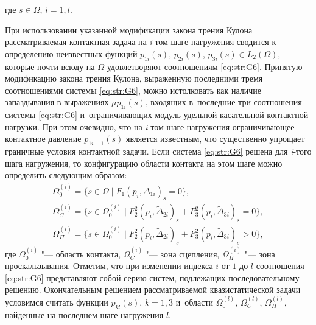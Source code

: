  где $s\in \Omega$, $i=\overline{1, l}$.

При использовании указанной модификации закона трения Кулона рассматриваемая контактная задача на \textit{i}-том шаге нагружения сводится к определению неизвестных функций $p_{1i} (s)$, $p_{2i} (s)$, $p_{3i} (s)\in L_{2} (\Omega)$, которые почти всюду на $\Omega $ удовлетворяют соотношениям \eqref{eq:str:G6}.
Принятую модификацию закона трения Кулона, выраженную последними тремя соотношениями системы \eqref{eq:str:G6}, можно истолковать как наличие запаздывания в выражениях $\mu  p_{1i} (s)$, входящих в~последние три соотношения системы \eqref{eq:str:G6} и~ограничивающих модуль удельной касательной контактной нагрузки.
При этом очевидно, что на \textit{i}-том шаге нагружения ограничивающее контактное давление $p_{1i-1} (s)$ является известным, что существенно упрощает граничные условия контактной задачи.
Если система \eqref{eq:str:G6} решена для \textit{i}-того шага нагружения, то конфигурацию области контакта на этом шаге можно определить следующим образом:
\begin{gather}
\Omega _{0}^{(i)} =\bigl\{s\in \Omega  \; |\; F_{1} \left(p_{i} ,\Delta _{1i} \right)_{s} =0\bigr\},
\\ 
\Omega _{C}^{(i)} =\bigl\{s\in \Omega _{0}^{(i)} \; |\; F_{2}^{2} (p_{i} ,\tilde{\Delta }_{2i} )_{s} +F_{3}^{2} (p_{i} ,\tilde{\Delta }_{3i} )_{s} =0\bigr\},
\\
\Omega _{\Pi }^{(i)} =\bigl\{s\in \Omega _{0}^{(i)}  \; |\; F_{2}^{2} (p_{i} ,\tilde{\Delta }_{2i} )_{s} +F_{3}^{2} (p_{i} ,\tilde{\Delta }_{3i} )_{s} >0\bigr\},
\end{gather}
где $\Omega _{0}^{(i)} $ "--- область контакта, $\Omega _{C}^{(i)} $ "--- зона сцепления, $\Omega _{\Pi }^{(i)} $ "--- зона проскальзывания.
Отметим, что при изменении индекса $i$ от $1$ до $l$ соотношения \eqref{eq:str:G6} представляют собой серию систем, подлежащих последовательному решению.
Окончательным решением рассматриваемой квазистатической задачи условимся считать функции $p_{kl} (s)$, $k=\overline{1, 3}$ и~области $\Omega _{0}^{(l)} $, $\Omega _{C}^{(l)} $, $\Omega _{\Pi }^{(l)} $, найденные на последнем шаге нагружения $l$.

\smallskip


